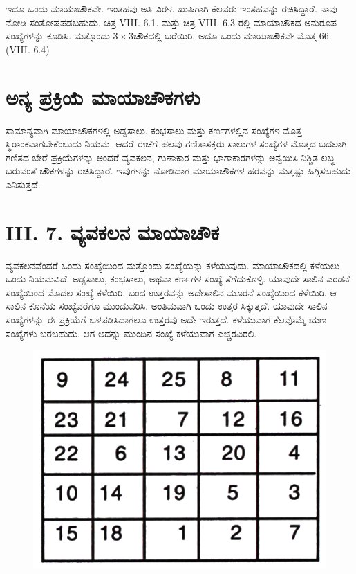 ಇದೂ ಒಂದು ಮಾಯಾಚೌಕವೇ. ಇಂತಹವು ಅತಿ ವಿರಳ. ಖುಷಿಗಾಗಿ ಕೆಲವರು ಇಂತಹವನ್ನು ರಚಿಸಿದ್ದಾರೆ. ನಾವು ನೋಡಿ ಸಂತೋಷಪಡಬಹುದು. ಚಿತ್ರ VIII. 6.1. ಮತ್ತು ಚಿತ್ರ VIII. 6.3 ರಲ್ಲಿ ಮಾಯಾಚೌಕದ ಅನುರೂಪ ಸಂಖ್ಯೆಗಳನ್ನು ಕೂಡಿಸಿ. ಮತ್ತೊಂದು $3 \times 3$ಚೌಕದಲ್ಲಿ ಬರೆಯಿರಿ. ಅದೂ ಒಂದು ಮಾಯಾಚೌಕವೇ ಮೊತ್ತ 66. (VIII. 6.4)

\section*{ಅನ್ಯ ಪ್ರಕ್ರಿಯೆ ಮಾಯಾಚೌಕಗಳು}

ಸಾಮಾನ್ಯವಾಗಿ ಮಾಯಾಚೌಕಗಳಲ್ಲಿ ಅಡ್ಡಸಾಲು, ಕಂಭಸಾಲು ಮತ್ತು ಕರ್ಣಗಳಲ್ಲಿನ ಸಂಖ್ಯೆಗಳ ಮೊತ್ತ ಸ್ಥಿರಾಂಕವಾಗಬೇಕೆಂಬುದು ನಿಯಮ. ಆದರೆ ಈಚೆಗೆ ಹಲವು ಗಣಿತಾಸಕ್ತರು ಸಾಲುಗಳ ಸಂಖ್ಯೆಗಳ ಮೊತ್ತದ ಬದಲಾಗಿ ಗಣಿತದ ಬೇರೆ ಪ್ರಕ್ರಿಯೆಗಳನ್ನು ಅಂದರೆ ವ್ಯವಕಲನ, ಗುಣಾಕಾರ ಮತ್ತು ಭಾಗಾಕಾರಗಳನ್ನು ಅನ್ವಯಿಸಿ ನಿಶ್ಚಿತ ಲಬ್ಧ ಬರುವಂತೆ ಚೌಕಗಳನ್ನು ರಚಿಸಿದ್ದಾರೆ. ಇವುಗಳನ್ನು ನೋಡಿದಾಗ ಮಾಯಾಚೌಕಗಳ ಹರವನ್ನು ಮತ್ತಷ್ಟು ಹಿಗ್ಗಿಸಬಹುದು ಎನಿಸುತ್ತದೆ.

\section*{ III. 7. ವ್ಯವಕಲನ ಮಾಯಾಚೌಕ}

ವ್ಯವಕಲನವೆಂದರೆ ಒಂದು ಸಂಖ್ಯೆಯಿಂದ ಮತ್ತೊಂದು ಸಂಖ್ಯೆಯನ್ನು ಕಳೆಯುವುದು. ಮಾಯಾಚೌಕದಲ್ಲಿ ಕಳೆಯಲು ಒಂದು ನಿಯಮವಿದೆ. ಅಡ್ಡಸಾಲು, ಕಂಭಸಾಲು, ಅಥವಾ ಕರ್ಣಗಳ ಸಂಖ್ಯೆ ತೆಗೆದುಕೊಳ್ಳಿ. ಯಾವುದೇ ಸಾಲಿನ ಎರಡನೆ ಸಂಖ್ಯೆಯಿಂದ ಮೊದಲ ಸಂಖ್ಯೆ ಕಳೆಯಿರಿ. ಬಂದ ಉತ್ತರವನ್ನು ಅದೇಸಾಲಿನ ಮೂರನೆ ಸಂಖ್ಯೆಯಿಂದ ಕಳೆಯಿರಿ. ಆ ಸಾಲಿನ ಕೊನೆಯ ಸಂಖ್ಯೆವರೆಗೂ ಮುಂದುವರಿಸಿ. ಅಂತಿಮವಾಗಿ ಒಂದು ಉತ್ತರ ಸಿಕ್ಕುತ್ತದೆ. ಯಾವುದೇ ಸಾಲಿನ ಸಂಖ್ಯೆಗಳನ್ನು ಈ ಪ್ರಕ್ರಿಯೆಗೆ ಒಳಪಡಿಸಿದಾಗಲೂ ಉತ್ತರವು ಅದೇ ಇರುತ್ತದೆ. ಕಳೆಯುವಾಗ ಕೆಲವೊಮ್ಮೆ ಋಣ ಸಂಖ್ಯೆಗಳು ಬರಬಹುದು. ಆಗ ಅದನ್ನು ಮುಂದಿನ ಸಂಖ್ಯೆ ಕಳೆಯುವಾಗ ಎಚ್ಚರವಿರಲಿ.
\begin{figure}[H]
\includegraphics{src/figures/chap7/fig7.24.jpg}
\end{figure}

